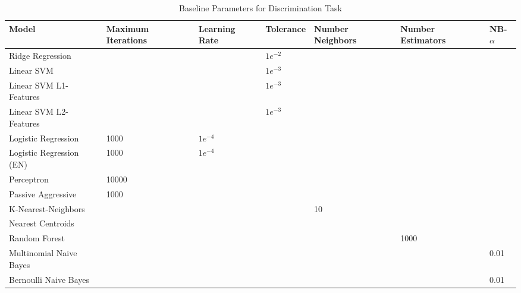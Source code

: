 \documentclass[sigconf]{acmart}
\begin{document}
\begin{table}[ht]
	\begin{tabular}{|l|l|l|l|l|l|l|}
    \hline\textbf{Model} & \textbf{Maximum Iterations} & \textbf{Learning Rate} & \textbf{Tolerance} & \textbf{Number Neighbors} & \textbf{Number Estimators} & \textbf{NB-$\alpha$}\\\hline
    Ridge Regression &   &   & $1e^{-2}$ &   &   &  \\\hline
    Linear SVM &   &   & $1e^{-3}$ &   &   &  \\\hline
    Linear SVM L1-Features &   &   & $1e^{-3}$ &   &   &  \\\hline
    Linear SVM L2-Features &   &   & $1e^{-3}$ &   &   &  \\\hline
    Logistic Regression & 1000 & $1e^{-4}$ &   &   &   &  \\\hline
    Logistic Regression (EN) & 1000 & $1e^{-4}$ &   &   &   &  \\\hline
    Perceptron & 10000 &   &   &   &   &  \\\hline
    Passive Aggressive & 1000 &   &   &   &   &  \\\hline
    K-Nearest-Neighbors &   &   &   & 10 &   &  \\\hline
    Nearest Centroids &   &   &   &   &   &  \\\hline
    Random Forest &   &   &   &   & 1000 &  \\\hline
    Multinomial Naive Bayes &   &   &   &   &   & 0.01\\\hline
    Bernoulli Naive Bayes &   &   &   &   &   & 0.01\\\hline
    \end{tabular}
    \caption{Baseline Parameters for Discrimination Task}
	\label{tab:dbline_params}
\end{table}





\end{document}
